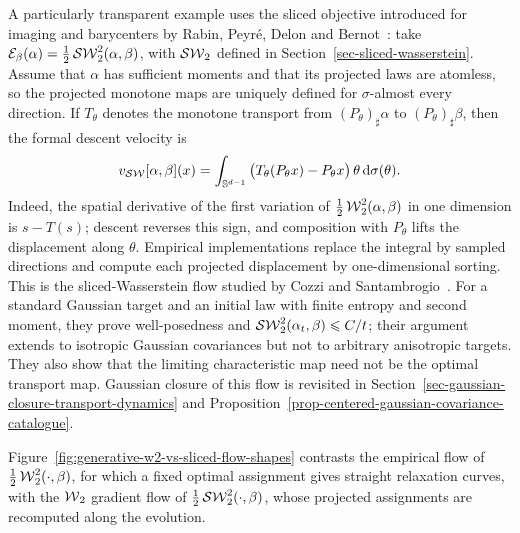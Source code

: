 A particularly transparent example uses the sliced objective introduced for imaging and barycenters by Rabin, Peyr\'e, Delon and Bernot~\cite{rabin-ssvm-11}: take $\mathcal E_\beta(\alpha)=\frac12\operatorname{\mathcal{SW}}_2^2(\alpha,\beta)$, with $\operatorname{\mathcal{SW}}_2$ defined in Section~\ref{sec-sliced-wasserstein}. Assume that $\alpha$ has sufficient moments and that its projected laws are atomless, so the projected monotone maps are uniquely defined for $\sigma$-almost every direction. If $T_\theta$ denotes the monotone transport from $(P_\theta)_\sharp\alpha$ to $(P_\theta)_\sharp\beta$, then the formal descent velocity is
\begin{equation}\label{eq-sliced-wasserstein-flow-velocity}
	v_{\operatorname{\mathcal{SW}}}[\alpha,\beta](x)
	=
	\int_{\mathbb{S}^{d-1}}
	\big(T_\theta(P_\theta x)-P_\theta x\big)\,\theta\,\mathrm{d}\sigma(\theta).
\end{equation}
Indeed, the spatial derivative of the first variation of $\frac12\operatorname{\mathcal{W}}_2^2(\alpha,\beta)$ in one dimension is $s-T(s)$; descent reverses this sign, and composition with $P_\theta$ lifts the displacement along $\theta$. Empirical implementations replace the integral by sampled directions and compute each projected displacement by one-dimensional sorting. This is the sliced-Wasserstein flow studied by Cozzi and Santambrogio~\cite{CozziSantambrogio2024SlicedFlow}. For a standard Gaussian target and an initial law with finite entropy and second moment, they prove well-posedness and $\operatorname{\mathcal{SW}}_2^2(\alpha_t,\beta)\leqslant C/t$; their argument extends to isotropic Gaussian covariances but not to arbitrary anisotropic targets. They also show that the limiting characteristic map need not be the optimal transport map. Gaussian closure of this flow is revisited in Section~\ref{sec-gaussian-closure-transport-dynamics} and Proposition~\ref{prop-centered-gaussian-covariance-catalogue}.

Figure~\ref{fig:generative-w2-vs-sliced-flow-shapes} contrasts the empirical flow of $\frac12\operatorname{\mathcal{W}}_2^2(\cdot,\beta)$, for which a fixed optimal assignment gives straight relaxation curves, with the $\operatorname{\mathcal{W}}_2$ gradient flow of $\frac12\operatorname{\mathcal{SW}}_2^2(\cdot,\beta)$, whose projected assignments are recomputed along the evolution.

